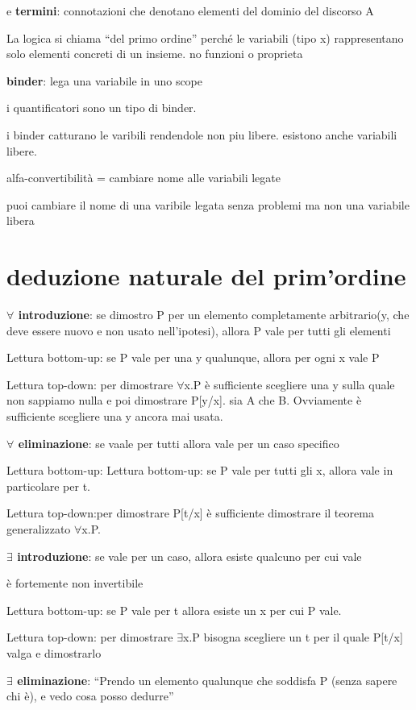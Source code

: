 \documentclass[12pt]{article}
\begin{document}
e \textbf{termini}: connotazioni che denotano elementi del dominio del discorso A

La logica si chiama “del primo ordine” perché le variabili (tipo x) rappresentano solo elementi concreti di un insieme. no funzioni o proprieta

\textbf{binder}: lega una variabile in uno scope

i quantificatori sono un tipo di binder.

i binder catturano le varibili rendendole non piu libere. esistono anche variabili libere.

alfa-convertibilità = cambiare nome alle variabili legate

puoi cambiare il nome di una varibile legata senza problemi ma non una variabile libera

\section{deduzione naturale del prim'ordine}

\textbf{$\forall$ introduzione}:
se dimostro P per un elemento completamente arbitrario(y, che deve essere nuovo e non usato nell'ipotesi), allora P vale per tutti gli elementi

Lettura bottom-up: se P vale per una y qualunque, allora per
ogni x vale P

Lettura top-down: per dimostrare $\forall$x.P è sufficiente scegliere
una y sulla quale non sappiamo nulla e poi dimostrare P[y/x].
sia A che B. Ovviamente è sufficiente scegliere una y ancora
mai usata.

\textbf{$\forall$ eliminazione}:
se vaale per tutti allora vale per un caso specifico

Lettura bottom-up: Lettura bottom-up: se P vale per tutti gli x, allora vale in
particolare per t.

Lettura top-down:per dimostrare P[t/x] è sufficiente
dimostrare il teorema generalizzato $\forall$x.P.


\textbf{$\exists$ introduzione}:
se vale per un caso, allora esiste qualcuno per cui vale

è fortemente non invertibile

Lettura bottom-up: se P vale per t allora esiste un x per cui P
vale.

Lettura top-down: per dimostrare $\exists$x.P bisogna scegliere un t
per il quale P[t/x] valga e dimostrarlo

\textbf{$\exists$ eliminazione}:
“Prendo un elemento qualunque che soddisfa P (senza sapere chi è), e vedo cosa posso dedurre”
\end{document}
